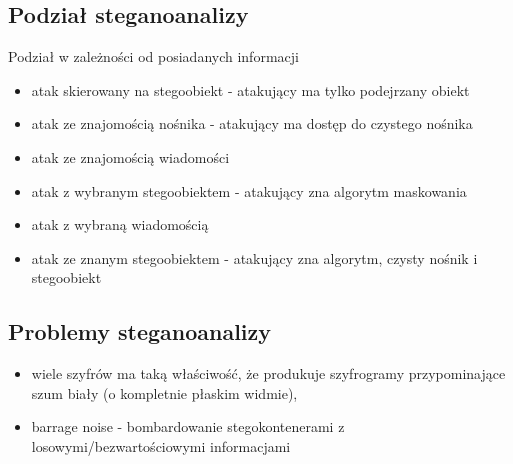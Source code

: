 \documentclass{article}
\begin{document}
\subsection{Podział steganoanalizy}
Podział w zależności od posiadanych informacji
\begin{itemize}
	\item atak skierowany na stegoobiekt  - atakujący ma tylko podejrzany obiekt
	\item atak ze znajomością nośnika - atakujący ma dostęp do czystego nośnika
	\item atak ze znajomością wiadomości
	\item atak z wybranym stegoobiektem - atakujący zna algorytm maskowania
	\item atak z wybraną wiadomością
	\item atak ze znanym stegoobiektem - atakujący zna algorytm, czysty nośnik i stegoobiekt
\end{itemize}
\subsection{Problemy steganoanalizy}
\begin{itemize}
	\item wiele szyfrów ma taką właściwość, że produkuje szyfrogramy przypominające szum biały (o kompletnie płaskim widmie),
	\item barrage noise - bombardowanie stegokontenerami z losowymi/bezwartościowymi informacjami
\end{itemize}
\end{document}
